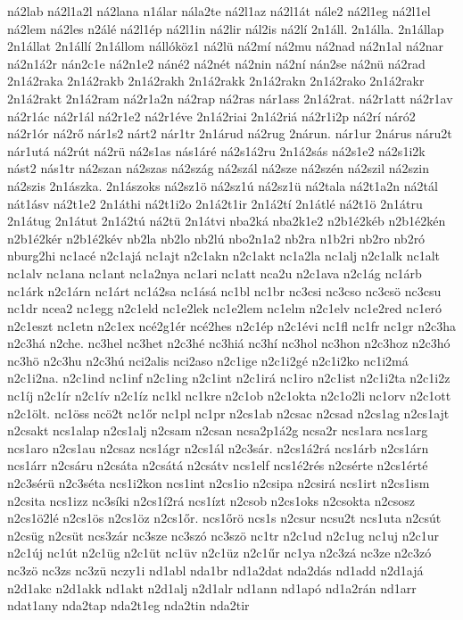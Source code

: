 {ná2lab
ná2l1a2l
ná2lana
n1álar
nála2te
ná2l1az
ná2l1át
nále2
ná2l1eg
ná2l1el
ná2lem
ná2les
n2álé
ná2l1ép
ná2l1in
ná2lir
nál2is
ná2lí
2n1áll.
2n1álla.
2n1állap
2n1állat
2n1állí
2n1állom
nállóköz1
ná2lü
ná2mí
ná2mu
ná2nad
ná2n1al
ná2nar
ná2n1á2r
nán2c1e
ná2n1e2
náné2
ná2nét
ná2nin
ná2ní
nán2se
ná2nü
ná2rad
2n1á2raka
2n1á2rakb
2n1á2rakh
2n1á2rakk
2n1á2rakn
2n1á2rako
2n1á2rakr
2n1á2rakt
2n1á2ram
ná2r1a2n
ná2rap
ná2ras
nár1ass
2n1á2rat.
ná2r1att
ná2r1av
ná2r1ác
ná2r1ál
ná2r1e2
ná2r1éve
2n1á2riai
2n1á2riá
ná2r1i2p
ná2rí
náró2
ná2r1ór
ná2rő
nár1s2
nárt2
nár1tr
2n1árud
ná2rug
2nárun.
nár1ur
2nárus
náru2t
nár1utá
ná2rút
ná2rü
ná2s1as
nás1áré
ná2s1á2ru
2n1á2sás
ná2s1e2
ná2s1i2k
nást2
nás1tr
ná2szan
ná2szas
ná2szág
ná2szál
ná2sze
ná2szén
ná2szil
ná2szin
ná2szis
2n1ászka.
2n1ászoks
ná2sz1ö
ná2sz1ú
ná2sz1ü
ná2tala
ná2t1a2n
ná2tál
nát1ásv
ná2t1e2
2n1áthi
ná2t1i2o
2n1á2t1ir
2n1á2tí
2n1átlé
ná2t1ö
2n1átru
2n1átug
2n1átut
2n1á2tú
ná2tü
2n1átvi
nba2ká
nba2k1e2
n2b1é2kéb
n2b1é2kén
n2b1é2kér
n2b1é2kév
nb2la
nb2lo
nb2lú
nbo2n1a2
nb2ra
n1b2ri
nb2ro
nb2ró
nburg2hi
nc1acé
n2c1ajá
nc1ajt
n2c1akn
n2c1akt
nc1a2la
nc1alj
n2c1alk
nc1alt
nc1alv
nc1ana
nc1ant
nc1a2nya
nc1ari
nc1att
nca2u
n2c1ava
n2c1ág
nc1árb
nc1árk
n2c1árn
nc1árt
nc1á2sa
nc1ásá
nc1bl
nc1br
nc3csi
nc3cso
nc3csö
nc3csu
nc1dr
ncea2
nc1egg
n2c1eld
nc1e2lek
nc1e2lem
nc1elm
n2c1elv
nc1e2red
nc1eró
n2c1eszt
nc1etn
n2c1ex
ncé2g1ér
ncé2hes
n2c1ép
n2c1évi
nc1fl
nc1fr
nc1gr
n2c3ha
n2c3há
n2che.
nc3hel
nc3het
n2c3hé
nc3hiá
nc3hí
nc3hol
nc3hon
n2c3hoz
n2c3hó
nc3hö
n2c3hu
n2c3hú
nci2alis
nci2aso
n2c1ige
n2c1i2gé
n2c1i2ko
nc1i2má
n2c1i2na.
n2c1ind
nc1inf
n2c1ing
n2c1int
n2c1irá
nc1iro
n2c1ist
n2c1i2ta
n2c1i2z
nc1íj
n2c1ír
n2c1ív
n2c1íz
nc1kl
nc1kre
n2c1ob
n2c1okta
n2c1o2li
nc1orv
n2c1ott
n2c1ölt.
nc1öss
ncö2t
nc1őr
nc1pl
nc1pr
n2cs1ab
n2csac
n2csad
n2cs1ag
n2cs1ajt
n2csakt
ncs1alap
n2cs1alj
n2csam
n2csan
ncsa2p1á2g
ncsa2r
ncs1ara
ncs1arg
ncs1aro
n2cs1au
n2csaz
ncs1ágr
n2cs1ál
n2c3sár.
n2cs1á2rá
ncs1árb
n2cs1árn
ncs1árr
n2csáru
n2csáta
n2csátá
n2csátv
ncs1elf
ncs1é2rés
n2csérte
n2cs1érté
n2c3sérü
n2c3séta
ncs1i2kon
ncs1int
n2cs1io
n2csipa
n2csirá
ncs1irt
n2cs1ism
n2csita
ncs1izz
nc3síki
n2cs1í2rá
ncs1ízt
n2csob
n2cs1oks
n2csokta
n2csosz
n2cs1ö2lé
n2cs1ös
n2cs1öz
n2cs1őr.
ncs1őrö
ncs1s
n2csur
ncsu2t
ncs1uta
n2csút
n2csüg
n2csüt
ncs3zár
nc3sze
nc3szó
nc3szö
nc1tr
n2c1ud
n2c1ug
nc1uj
n2c1ur
n2c1új
nc1út
n2c1üg
n2c1üt
nc1üv
n2c1üz
n2c1űr
nc1ya
n2c3zá
nc3ze
n2c3zó
nc3zö
nc3zs
nc3zü
nczy1i
nd1abl
nda1br
nd1a2dat
nda2dás
nd1add
n2d1ajá
n2d1akc
n2d1akk
nd1akt
n2d1alj
n2d1alr
nd1ann
nd1apó
nd1a2rán
nd1arr
ndat1any
nda2tap
nda2t1eg
nda2tin
nda2tir
}
